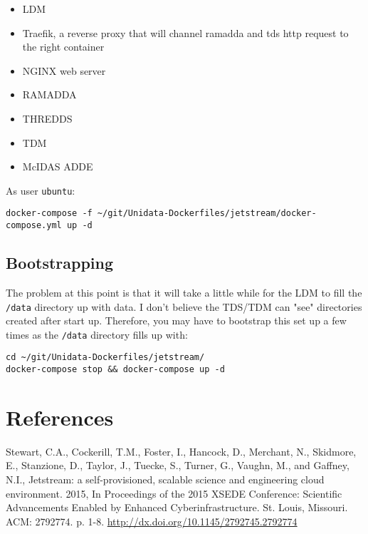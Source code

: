 \documentclass[onecolumn,9pt]{article}
\renewcommand{\href}[2]{#2\footnoteURL{\url{#1}}}
\begin{document}
\begin{itemize}
\item LDM
\item \href{https://traefik.io/}{Traefik}, a reverse proxy that will channel ramadda and tds http request to the right container
\item NGINX web server
\item RAMADDA
\item THREDDS
\item TDM
\item McIDAS ADDE
\end{itemize}

As user \texttt{ubuntu}:

\lstset{frame=lines,basicstyle=\footnotesize,numbers=left,numberstyle=\tiny,language=sh,label= ,caption= ,captionpos=b}
\begin{lstlisting}
docker-compose -f ~/git/Unidata-Dockerfiles/jetstream/docker-compose.yml up -d
\end{lstlisting}

\subsection{Bootstrapping}
\label{sec:orgheadline33}

The problem at this point is that it will take a little while for the LDM to fill the \texttt{/data} directory up with data. I don't believe the TDS/TDM can "see" directories created after start up. Therefore, you may have to bootstrap this set up a few times as the \texttt{/data} directory fills up with:

\lstset{frame=lines,basicstyle=\footnotesize,numbers=left,numberstyle=\tiny,language=sh,label= ,caption= ,captionpos=b}
\begin{lstlisting}
cd ~/git/Unidata-Dockerfiles/jetstream/
docker-compose stop && docker-compose up -d
\end{lstlisting}

\section{References}
\label{sec:orgheadline35}

Stewart, C.A., Cockerill, T.M., Foster, I., Hancock, D., Merchant, N., Skidmore, E., Stanzione, D., Taylor, J., Tuecke, S., Turner, G., Vaughn, M., and Gaffney, N.I., Jetstream: a self-provisioned, scalable science and engineering cloud environment. 2015, In Proceedings of the 2015 XSEDE Conference: Scientific Advancements Enabled by Enhanced Cyberinfrastructure. St. Louis, Missouri. ACM: 2792774. p. 1-8. \url{http://dx.doi.org/10.1145/2792745.2792774}
\end{document}
